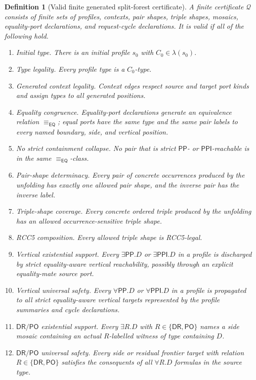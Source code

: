 \documentclass[11pt]{article}
\newtheorem{definition}[theorem]{Definition}
\newcommand{\EQ}{\mathsf{EQ}}
\newcommand{\DR}{\mathsf{DR}}
\newcommand{\PO}{\mathsf{PO}}
\newcommand{\PP}{\mathsf{PP}}
\newcommand{\PPI}{\mathsf{PPI}}
\newcommand{\Q}{\mathcal Q}
\newcommand{\eqc}{\equiv_{\EQ}}
\begin{document}
\begin{definition}[Valid finite generated split-forest certificate]\label{def:valid-certificate}
A finite certificate $\Q$ consists of finite sets of profiles, contexts, pair shapes, triple shapes, mosaics, equality-port declarations, and request-cycle declarations.  It is valid if all of the following hold.
\begin{enumerate}[label=(V\arabic*)]
\item \emph{Initial type.}  There is an initial profile $s_0$ with $C_0\in\lambda(s_0)$.
\item \emph{Type legality.}  Every profile type is a $C_0$-type.
\item \emph{Generated context legality.}  Context edges respect source and target port kinds and assign types to all generated positions.
\item \emph{Equality congruence.}  Equality-port declarations generate an equivalence relation $\eqc$; equal ports have the same type and the same pair labels to every named boundary, side, and vertical position.
\item \emph{No strict containment collapse.}  No pair that is strict $\PP$- or $\PPI$-reachable is in the same $\eqc$-class.
\item \emph{Pair-shape determinacy.}  Every pair of concrete occurrences produced by the unfolding has exactly one allowed pair shape, and the inverse pair has the inverse label.
\item \emph{Triple-shape coverage.}  Every concrete ordered triple produced by the unfolding has an allowed occurrence-sensitive triple shape.
\item \emph{RCC5 composition.}  Every allowed triple shape is RCC5-legal.
\item \emph{Vertical existential support.}  Every $\exists\PP.D$ or $\exists\PPI.D$ in a profile is discharged by strict equality-aware vertical reachability, possibly through an explicit equality-mate source port.
\item \emph{Vertical universal safety.}  Every $\forall\PP.D$ or $\forall\PPI.D$ in a profile is propagated to all strict equality-aware vertical targets represented by the profile summaries and cycle declarations.
\item \emph{$\DR/\PO$ existential support.}  Every $\exists R.D$ with $R\in\{\DR,\PO\}$ names a side mosaic containing an actual $R$-labelled witness of type containing $D$.
\item \emph{$\DR/\PO$ universal safety.}  Every side or residual frontier target with relation $R\in\{\DR,\PO\}$ satisfies the consequents of all $\forall R.D$ formulas in the source type.

\end{enumerate}
\end{definition}
\end{document}
